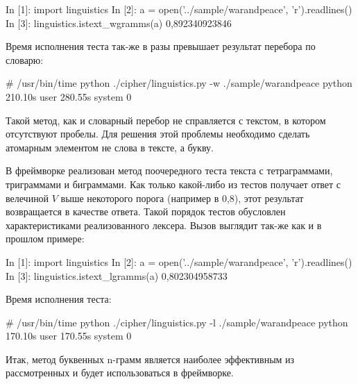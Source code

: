 \begin{listing}[1]{1}
In [1]: import linguistics
In [2]: a = open('../sample/warandpeace', 'r').readlines()
In [3]: linguistics.istext\_wgramms(a)
0,892340923846
\end{listing}

Время исполнения теста так-же в разы превышает результат 
перебора по словарю:

\begin{listing}[1]{1}
# /usr/bin/time python ./cipher/linguistics.py -w ./sample/warandpeace 
python  210.10s user 280.55s system 0%
\end{listing}

Такой метод, как и словарный перебор не справляется с 
текстом, в котором отсутствуют пробелы. Для решения 
этой проблемы необходимо сделать атомарным элементом 
не слова в тексте, а букву. 

В фреймворке реализован метод поочередного теста текста с 
тетраграммами, триграммами и биграммами. Как только какой-либо 
из тестов получает ответ с велечиной $V$ выше некоторого порога 
(например в 0,8), этот результат возвращается в качестве 
ответа. Такой порядок тестов обусловлен характеристиками 
реализованного лексера. Вызов выглядит так-же как и 
в прошлом примере: 

\begin{listing}[1]{1}
In [1]: import linguistics
In [2]: a = open('../sample/warandpeace', 'r').readlines()
In [3]: linguistics.istext_lgramms(a)
0,802304958733
\end{listing}

Время исполнения теста:

\begin{listing}[1]{1}
# /usr/bin/time python ./cipher/linguistics.py -l ./sample/warandpeace 
python  170.10s user 170.55s system 0%
\end{listing}

Итак, метод буквенных n-грамм является наиболее эффективным
из рассмотренных и будет использоваться в фреймворке.

